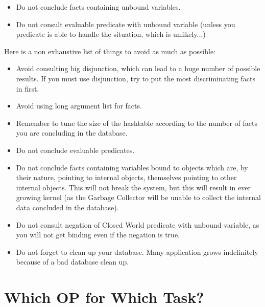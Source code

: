 \begin{itemize}

\item Do not conclude facts containing unbound variables.

\item Do not consult evaluable predicate with unbound variable (unless
you predicate is able to handle the situation, which is unlikely...)

\end{itemize}

Here is a non exhaustive list of things to avoid as much as possible:

\begin{itemize}

\item Avoid consulting big disjunction, which can lead to a huge number
of possible results. If you must use disjunction, try to put the most
discriminating facts in first.

\item Avoid using long argument list for facts.

\item Remember to tune the size of the hashtable according to the number
of facts you are concluding in the database.

\item Do not conclude evaluable predicates.

\item Do not conclude facts containing variables bound to objects which
are, by their nature, pointing to internal objects, themselves pointing
to other internal objects. This will not break the system, but this will
result in ever growing kernel (as the Garbage Collector will be unable to
collect the internal data concluded in the database).

\item Do not consult negation of Closed World predicate with unbound
variable, as you will not get binding even if the negation is true.

\item Do not forget to clean up your database. Many application grows
indefinitely because of a bad database clean up.

\end{itemize}

\section{Which OP for Which Task?}



